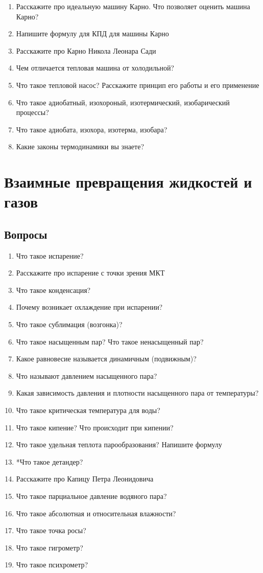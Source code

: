 \documentclass[12pt,a4paper]{report}
\begin{document}
\begin{enumerate}
\item Расскажите про идеальную машину Карно. Что позволяет оценить машина Карно?
\item Напишите формулу для КПД для машины Карно
\item Расскажите про Карно Никола Леонара Сади
\item Чем отличается тепловая машина от холодильной?
\item Что такое тепловой насос? Расскажите принцип его работы и его применение
\item Что такое адиобатный, изохороный, изотермический, изобарический процессы?
\item Что такое адиобата, изохора, изотерма, изобара?
\item Какие законы термодинамики вы знаете?
\end{enumerate}

\chapter{Взаимные превращения жидкостей и газов}

\section{Вопросы}
\begin{enumerate}
\item Что такое испарение?
\item Расскажите про испарение с точки зрения МКТ
\item Что такое конденсация?
\item Почему возникает охлаждение при испарении?
\item Что такое сублимация (возгонка)?
\item Что такое насыщенным пар? Что такое ненасыщенный пар?
\item Какое равновесие называется динамичным (подвижным)?
\item Что называют давлением насыщенного пара?
\item Какая зависимость давления и плотности насыщенного пара от температуры?
\item Что такое критическая температура для воды?
\item Что такое кипение? Что происходит при кипении?
\item Что такое удельная теплота парообразования? Напишите формулу
\item *Что такое детандер?
\item Расскажите про Капицу Петра Леонидовича
\item Что такое парциальное давление водяного пара?
\item Что такое абсолютная и относительная влажности?
\item Что такое точка росы?
\item Что такое гигрометр?
\item Что такое психрометр?
\end{enumerate}
\end{document}
